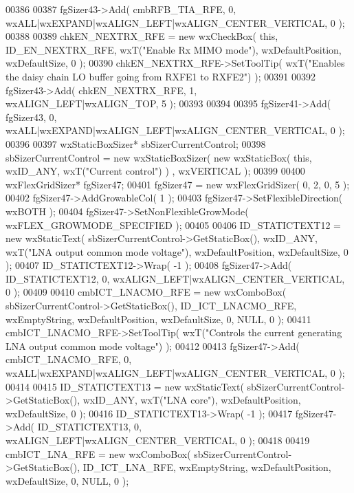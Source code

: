 \begin{DoxyCode}
00386     
00387     fgSizer43->Add( cmbRFB_TIA_RFE, 0, wxALL|wxEXPAND|wxALIGN\_LEFT|wxALIGN\_CENTER\_VERTICAL, 0 );
00388     
00389     chkEN_NEXTRX_RFE = \textcolor{keyword}{new} wxCheckBox( \textcolor{keyword}{this}, ID_EN_NEXTRX_RFE, wxT(\textcolor{stringliteral}{"Enable Rx MIMO mode"}), 
      wxDefaultPosition, wxDefaultSize, 0 );
00390     chkEN_NEXTRX_RFE->SetToolTip( wxT(\textcolor{stringliteral}{"Enables the daisy chain LO buffer going from RXFE1  to RXFE2"}) );
00391     
00392     fgSizer43->Add( chkEN_NEXTRX_RFE, 1, wxALIGN\_LEFT|wxALIGN\_TOP, 5 );
00393     
00394     
00395     fgSizer41->Add( fgSizer43, 0, wxALL|wxEXPAND|wxALIGN\_LEFT|wxALIGN\_CENTER\_VERTICAL, 0 );
00396     
00397     wxStaticBoxSizer* sbSizerCurrentControl;
00398     sbSizerCurrentControl = \textcolor{keyword}{new} wxStaticBoxSizer( \textcolor{keyword}{new} wxStaticBox( \textcolor{keyword}{this}, wxID\_ANY, wxT(\textcolor{stringliteral}{"Current control"}) )
      , wxVERTICAL );
00399     
00400     wxFlexGridSizer* fgSizer47;
00401     fgSizer47 = \textcolor{keyword}{new} wxFlexGridSizer( 0, 2, 0, 5 );
00402     fgSizer47->AddGrowableCol( 1 );
00403     fgSizer47->SetFlexibleDirection( wxBOTH );
00404     fgSizer47->SetNonFlexibleGrowMode( wxFLEX\_GROWMODE\_SPECIFIED );
00405     
00406     ID_STATICTEXT12 = \textcolor{keyword}{new} wxStaticText( sbSizerCurrentControl->GetStaticBox(), wxID\_ANY, wxT(\textcolor{stringliteral}{"LNA output
       common mode voltage"}), wxDefaultPosition, wxDefaultSize, 0 );
00407     ID_STATICTEXT12->Wrap( -1 );
00408     fgSizer47->Add( ID_STATICTEXT12, 0, wxALIGN\_LEFT|wxALIGN\_CENTER\_VERTICAL, 0 );
00409     
00410     cmbICT_LNACMO_RFE = \textcolor{keyword}{new} wxComboBox( sbSizerCurrentControl->GetStaticBox(), 
      ID_ICT_LNACMO_RFE, wxEmptyString, wxDefaultPosition, wxDefaultSize, 0, NULL, 0 ); 
00411     cmbICT_LNACMO_RFE->SetToolTip( wxT(\textcolor{stringliteral}{"Controls the current generating LNA output common mode voltage"}) );
00412     
00413     fgSizer47->Add( cmbICT_LNACMO_RFE, 0, wxALL|wxEXPAND|wxALIGN\_LEFT|wxALIGN\_CENTER\_VERTICAL, 0 );
00414     
00415     ID_STATICTEXT13 = \textcolor{keyword}{new} wxStaticText( sbSizerCurrentControl->GetStaticBox(), wxID\_ANY, wxT(\textcolor{stringliteral}{"LNA core"}), 
      wxDefaultPosition, wxDefaultSize, 0 );
00416     ID_STATICTEXT13->Wrap( -1 );
00417     fgSizer47->Add( ID_STATICTEXT13, 0, wxALIGN\_LEFT|wxALIGN\_CENTER\_VERTICAL, 0 );
00418     
00419     cmbICT_LNA_RFE = \textcolor{keyword}{new} wxComboBox( sbSizerCurrentControl->GetStaticBox(), 
      ID_ICT_LNA_RFE, wxEmptyString, wxDefaultPosition, wxDefaultSize, 0, NULL, 0 ); 

\end{DoxyCode}
